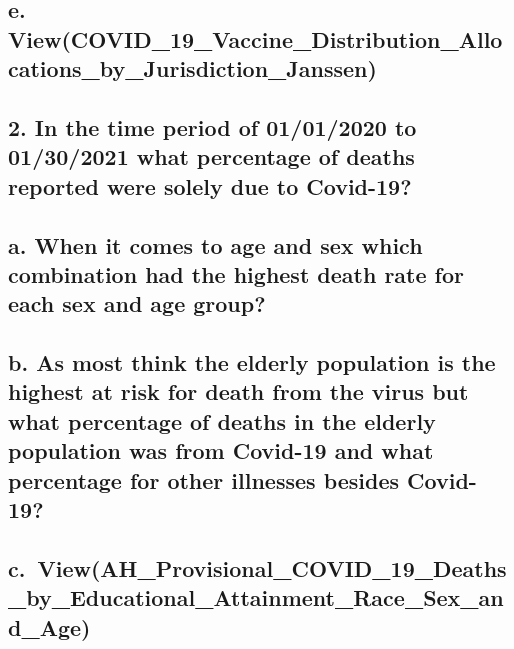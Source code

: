 \documentclass[
]{article}
\begin{document}
\hypertarget{e.-viewcovid_19_vaccine_distribution_allocations_by_jurisdiction_janssen}{%
\subsection{e.
View(COVID\_19\_Vaccine\_Distribution\_Allocations\_by\_Jurisdiction\_Janssen)}\label{e.-viewcovid_19_vaccine_distribution_allocations_by_jurisdiction_janssen}}

\hypertarget{in-the-time-period-of-01012020-to-01302021-what-percentage-of-deaths-reported-were-solely-due-to-covid-19}{%
\subsection{2. In the time period of 01/01/2020 to 01/30/2021 what
percentage of deaths reported were solely due to
Covid-19?}\label{in-the-time-period-of-01012020-to-01302021-what-percentage-of-deaths-reported-were-solely-due-to-covid-19}}

\hypertarget{a.-when-it-comes-to-age-and-sex-which-combination-had-the-highest-death-rate-for-each-sex-and-age-group}{%
\subsection{a. When it comes to age and sex which combination had the
highest death rate for each sex and age
group?}\label{a.-when-it-comes-to-age-and-sex-which-combination-had-the-highest-death-rate-for-each-sex-and-age-group}}

\hypertarget{b.-as-most-think-the-elderly-population-is-the-highest-at-risk-for-death-from-the-virus-but-what-percentage-of-deaths-in-the-elderly-population-was-from-covid-19-and-what-percentage-for-other-illnesses-besides-covid-19}{%
\subsection{b. As most think the elderly population is the highest at
risk for death from the virus but what percentage of deaths in the
elderly population was from Covid-19 and what percentage for other
illnesses besides
Covid-19?}\label{b.-as-most-think-the-elderly-population-is-the-highest-at-risk-for-death-from-the-virus-but-what-percentage-of-deaths-in-the-elderly-population-was-from-covid-19-and-what-percentage-for-other-illnesses-besides-covid-19}}

\hypertarget{c.-viewah_provisional_covid_19_deaths_by_educational_attainment_race_sex_and_age}{%
\subsection{c.~View(AH\_Provisional\_COVID\_19\_Deaths\_by\_Educational\_Attainment\_Race\_Sex\_and\_Age)}\label{c.-viewah_provisional_covid_19_deaths_by_educational_attainment_race_sex_and_age}}
\end{document}
